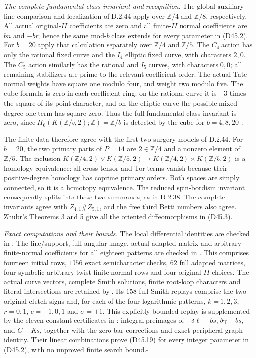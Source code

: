 \emph{The complete fundamental-class invariant and recognition.}
The global auxiliary-line comparison and localization
of D.2.44 apply over $\mathbb Z/4$ and $\mathbb Z/8$,
respectively. All actual original-$II$ coefficients
are zero and all finite-$II$ normal coefficients
are $bn$ and $-br$; hence the same mod-$b$ class
extends for every parameter in (D45.2).
For $b=20$ apply that calculation separately over
$\mathbb Z/4$ and $\mathbb Z/5$. The $C_4$ action
has only the rational fixed curve and the $I_4$
elliptic fixed curve, with characters $2,0$.
The $C_5$ action similarly has the rational and
$I_5$ curves, with characters $0,0$; all remaining
stabilizers are prime to the relevant coefficient
order. The actual Tate normal weights have square
one modulo four, and weight two modulo five.
The cube formula is zero in each coefficient ring:
on the rational curve it is $-3$ times the square
of its point character, and on the elliptic curve
the possible mixed degree-one term has square zero.
Thus the full fundamental-class invariant is zero,
since $H_6(K(\mathbb Z/b,2);\mathbb Z)=\mathbb Z/b$
is detected by the cube for $b=4,8,20$
\cite[Sections 3.11--3.14]{manZhubr75}.

The finite data therefore agree with the first two
surgery models of D.2.44. For $b=20$, the two
primary parts of $P=14$ are $2\in\mathbb Z/4$
and a nonzero element of $\mathbb Z/5$.
The inclusion
$K(\mathbb Z/4,2)\vee K(\mathbb Z/5,2)
\to K(\mathbb Z/4,2)\times K(\mathbb Z/5,2)$
is a homology equivalence: all cross tensor and
Tor terms vanish because their positive-degree
homology has coprime primary orders. Both spaces
are simply connected, so it is a homotopy equivalence.
The reduced spin-bordism invariant consequently
splits into these two summands, as in D.2.38.
The complete invariants agree with
$Z_{4,1}\#Z_{5,1}$, and the free third Betti numbers
also agree. Zhubr's Theorems 3 and 5
\cite{manZhubr75} give all the oriented
diffeomorphisms in (D45.3).

\emph{Exact computations and their bounds.}
The local differential identities are checked in
.
The line/support, full angular-image, actual
adapted-matrix and arbitrary finite-normal
coefficients for all eighteen patterns are checked in
.
This comprises fourteen initial rows, $1056$ exact
semicharacter checks, $62$ full adapted matrices,
four symbolic arbitrary-twist finite normal rows
and four original-$II$ choices.
The actual curve vectors, complete Smith solutions,
finite root-loop characters and literal intersections
are retained by
.
Its $158$ full Smith replays comprise the two original
clutch signs and, for each of the four logarithmic
patterns, $k=1,2,3$, $r=0,1$, $e=-1,0,1$ and
$\sigma=\pm1$. This explicitly bounded replay is
supplemented by the eleven constant certificates in
:
integral preimages of $-\delta\ell-bs$,
$\delta\gamma+bs$, and $C-Ks$, together with the
zero bar corrections and exact peripheral graph
identity. Their linear combinations prove (D45.19)
for every integer parameter in (D45.2), with no
unproved finite search bound.\hfill$\square$
